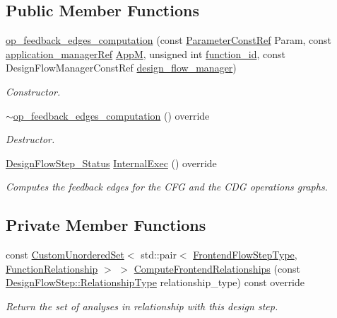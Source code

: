 \subsection*{Public Member Functions}
\begin{DoxyCompactItemize}
\item 
\hyperlink{classop__feedback__edges__computation_a72e8d5d9bb051b0f439168bad95abe33}{op\+\_\+feedback\+\_\+edges\+\_\+computation} (const \hyperlink{Parameter_8hpp_a37841774a6fcb479b597fdf8955eb4ea}{Parameter\+Const\+Ref} Param, const \hyperlink{application__manager_8hpp_a04ccad4e5ee401e8934306672082c180}{application\+\_\+manager\+Ref} \hyperlink{classFrontendFlowStep_a0ac0d8db2a378416583f51c4faa59d15}{AppM}, unsigned int \hyperlink{classFunctionFrontendFlowStep_a58ef2383ad1a212a8d3f396625a4b616}{function\+\_\+id}, const Design\+Flow\+Manager\+Const\+Ref \hyperlink{classDesignFlowStep_ab770677ddf087613add30024e16a5554}{design\+\_\+flow\+\_\+manager})
\begin{DoxyCompactList}\small\item\em Constructor. \end{DoxyCompactList}\item 
\hyperlink{classop__feedback__edges__computation_a438cebd996233f9b4c61ada0052fa444}{$\sim$op\+\_\+feedback\+\_\+edges\+\_\+computation} () override
\begin{DoxyCompactList}\small\item\em Destructor. \end{DoxyCompactList}\item 
\hyperlink{design__flow__step_8hpp_afb1f0d73069c26076b8d31dbc8ebecdf}{Design\+Flow\+Step\+\_\+\+Status} \hyperlink{classop__feedback__edges__computation_aea1d74075f6fed53eaf6b8829ec400e1}{Internal\+Exec} () override
\begin{DoxyCompactList}\small\item\em Computes the feedback edges for the C\+FG and the C\+DG operations graphs. \end{DoxyCompactList}\end{DoxyCompactItemize}
\subsection*{Private Member Functions}
\begin{DoxyCompactItemize}
\item 
const \hyperlink{classCustomUnorderedSet}{Custom\+Unordered\+Set}$<$ std\+::pair$<$ \hyperlink{frontend__flow__step_8hpp_afeb3716c693d2b2e4ed3e6d04c3b63bb}{Frontend\+Flow\+Step\+Type}, \hyperlink{classFrontendFlowStep_af7cf30f2023e5b99e637dc2058289ab0}{Function\+Relationship} $>$ $>$ \hyperlink{classop__feedback__edges__computation_ac9b97f89404bcc4be3eda0ec012e6728}{Compute\+Frontend\+Relationships} (const \hyperlink{classDesignFlowStep_a723a3baf19ff2ceb77bc13e099d0b1b7}{Design\+Flow\+Step\+::\+Relationship\+Type} relationship\+\_\+type) const override
\begin{DoxyCompactList}\small\item\em Return the set of analyses in relationship with this design step. \end{DoxyCompactList}\end{DoxyCompactItemize}
